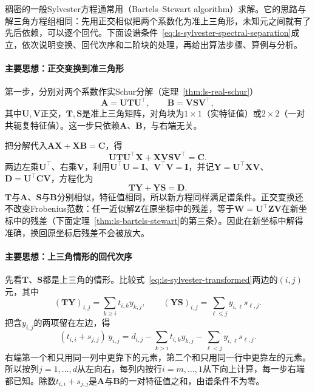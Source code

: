 稠密的一般Sylvester方程通常用（Bartels--Stewart algorithm）求解。它的思路与解三角方程组相同：先用正交相似把两个系数化为准上三角形，未知元之间就有了先后依赖，可以逐个回代。下面设谱条件~\eqref{eq:ls-sylvester-spectral-separation}成立，依次说明变换、回代次序和二阶块的处理，再给出算法步骤、算例与分析。

\paragraph{主要思想：正交变换到准三角形}
第一步，分别对两个系数作实Schur分解（定理~\ref{thm:ls-real-schur}）
\[
 \bm A=\bm U\bm T\bm U^\top,\qquad \bm B=\bm V\bm S\bm V^\top,
\]
其中$\bm U,\bm V$正交，$\bm T,\bm S$是准上三角矩阵，对角块为$1\times1$（实特征值）或$2\times2$（一对共轭复特征值）。这一步只依赖$\bm A$、$\bm B$，与右端无关。

把分解代入$\bm A\bm X+\bm X\bm B=\bm C$，得
\[
 \bm U\bm T\bm U^\top\bm X+\bm X\bm V\bm S\bm V^\top=\bm C .
\]
两边左乘$\bm U^\top$、右乘$\bm V$，利用$\bm U^\top\bm U=\bm I$、$\bm V^\top\bm V=\bm I$，并记$\bm Y=\bm U^\top\bm X\bm V$、$\bm D=\bm U^\top\bm C\bm V$，方程化为
\begin{equation}
 \bm T\bm Y+\bm Y\bm S=\bm D .
 \label{eq:ls-sylvester-transformed}
\end{equation}
$\bm T$与$\bm A$、$\bm S$与$\bm B$分别相似，特征值相同，所以新方程同样满足谱条件。正交变换还不改变Frobenius范数：任一近似解$\bm Z$在原坐标中的残差，等于$\bm W=\bm U^\top\bm Z\bm V$在新坐标中的残差（下面定理~\ref{thm:ls-bartels-stewart}的第三条）。因此在新坐标中解得准确，换回原坐标后残差不会被放大。

\paragraph{主要思想：上三角情形的回代次序}
先看$\bm T$、$\bm S$都是上三角的情形。比较式~\eqref{eq:ls-sylvester-transformed}两边的$(i,j)$元，其中
\[
 (\bm T\bm Y)_{i,j}=\sum_{k\geq i}t_{i,k}y_{k,j},\qquad
 (\bm Y\bm S)_{i,j}=\sum_{\ell\leq j}y_{i,\ell}s_{\ell,j}.
\]
把含$y_{i,j}$的两项留在左边，得
\begin{equation}
 (t_{i,i}+s_{j,j})\,y_{i,j}
 =d_{i,j}-\sum_{k>i}t_{i,k}y_{k,j}-\sum_{\ell<j}y_{i,\ell}s_{\ell,j}.
 \label{eq:ls-sylvester-triangular-entry}
\end{equation}
右端第一个和只用同一列中更靠下的元素，第二个和只用同一行中更靠左的元素。所以按列$j=1,\ldots,d$从左向右，每列内按行$i=m,\ldots,1$从下向上计算，每一步右端都已知。除数$t_{i,i}+s_{j,j}$是$\bm A$与$\bm B$的一对特征值之和，由谱条件不为零。

